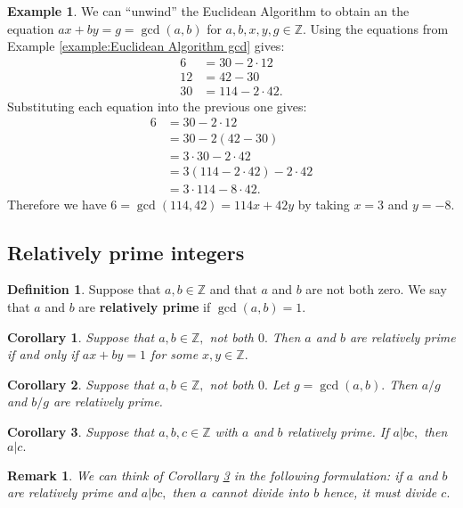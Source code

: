 \documentclass[12pt, a4paper]{article}
\newcommand{\bb}[1]{\mathbb{#1}}
\newtheorem*{remark}{Remark}
\theoremstyle{definition}
\newtheorem{definition}{Definition}[section]
\newtheorem*{example}{Example}
\theoremstyle{plain}
\newtheorem{corollary}{Corollary}[theorem]
\begin{document}
\begin{example}
We can ``unwind'' the Euclidean Algorithm to obtain an the equation $ax+by=g=\gcd(a,b)$ for $a,b,x,y,g \in \bb{Z}.$ Using the equations from Example \ref{example:Euclidean Algorithm gcd} gives: 
$$\begin{aligned}
6&=30-2\cdot12 \\
12 &=42-30 \\
30&=114-2\cdot 42.
\end{aligned}$$ 
Substituting each equation into the previous one gives: 
$$\begin{aligned}
6	&=30-2\cdot 12 \\
	&=30-2(42-30) \\
	&=3\cdot 30 - 2\cdot 42\\
	&=3(114-2\cdot 42)-2\cdot 42 \\
	&=3\cdot114 -8\cdot 42.
\end{aligned}$$
Therefore we have $6=\gcd(114,42)=114x+42y$ by taking $x=3$ and $y=-8.$
\end{example}

\subsection{Relatively prime integers}

\begin{definition}
Suppose that $a,b \in \bb{Z}$ and that $a$ and $b$ are not both zero. We say that $a$ and $b$ are \textbf{relatively prime} if $\gcd(a, b) = 1.$
\end{definition}

\begin{corollary}
Suppose that $a, b \in \bb{Z},$ not both $0.$ Then $a$ and $b$ are relatively prime if and only if $ax + by = 1$ for some $x, y \in \bb{Z}.$
\end{corollary}

\begin{corollary}
Suppose that $a, b \in \bb{Z},$ not both $0.$ Let $g = \gcd(a, b).$ Then $a/g$ and $b/g$ are relatively prime.
\end{corollary}

\begin{corollary}\label{corollary:coprime divisibility}
Suppose that $a, b, c \in \bb{Z}$ with $a$ and $b$ relatively prime. If $a|bc,$ then $a|c.$
\end{corollary}

\begin{remark}
We can think of Corollary \ref{corollary:coprime divisibility} in the following formulation: if $a$ and $b$ are relatively prime and $a|bc,$ then $a$ cannot divide into $b$ hence, it must divide $c.$
\end{remark}
\end{document}
